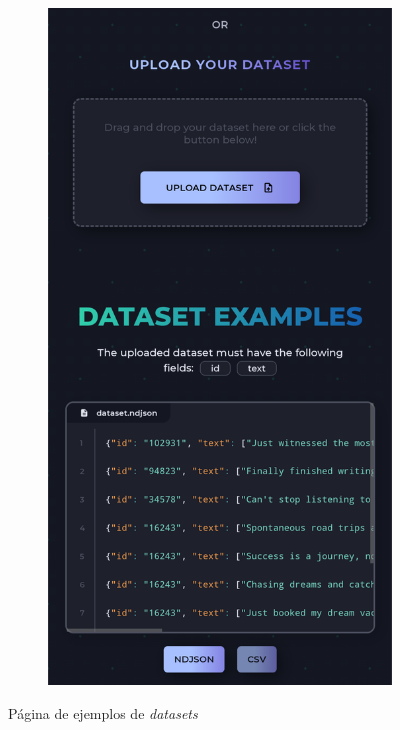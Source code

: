 \begin{figure}[H]
\begin{subfigure}[c]{0.21\textwidth}
			\includegraphics[width=\textwidth]{imagenes/examples_movil.png}
			\label{fig:casouso_examples_movil}
	\end{subfigure}
	\vspace{-1\baselineskip}
	\caption{Página de ejemplos de \textit{datasets}}
	\label{fig:casouso_examples}
\end{figure}

